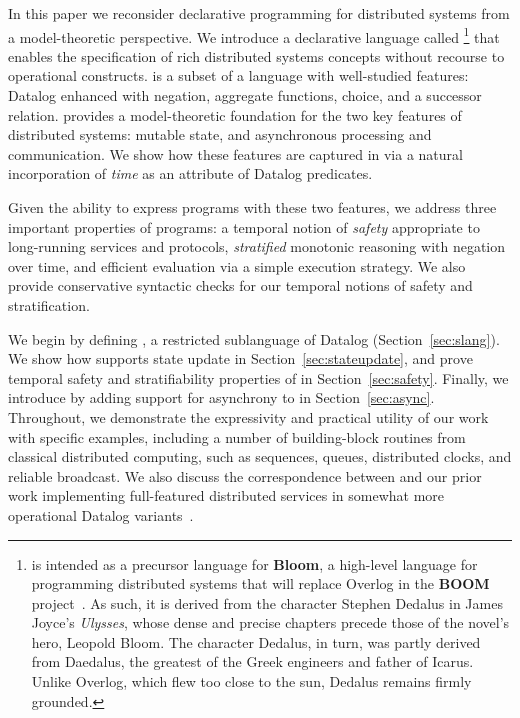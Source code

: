 In this paper we reconsider declarative programming for distributed
systems from a model-theoretic perspective. We introduce a declarative
language called \lang\footnote{\small \lang is intended as a precursor
  language for \textbf{Bloom}, a high-level language for programming
  distributed systems that will replace Overlog in the \textbf{BOOM}
  project~\cite{boom-eurosys}.  As such, it is derived from the
  character Stephen Dedalus in James Joyce's \emph{Ulysses}, whose
  dense and precise chapters precede those of the novel's hero,
  Leopold Bloom.  The character Dedalus, in turn, was partly derived
  from Daedalus, the greatest of the Greek engineers and father of
  Icarus.  Unlike Overlog, which flew too close to the sun, Dedalus
  remains firmly grounded.  } that enables the specification of rich
distributed systems concepts without recourse to operational
constructs.  \lang is a subset of a language with well-studied
features: Datalog enhanced with negation, aggregate functions, choice,
and a successor relation.  \lang provides a model-theoretic foundation
for the two key features of distributed systems: mutable state, and
asynchronous processing and communication.  We show how these features
are captured in \lang via a natural incorporation of {\em time} as an
attribute of Datalog predicates.

Given the ability to express programs with these two features, we
address three important properties of \lang programs: a temporal
notion of {\em safety} appropriate to long-running services and
protocols, {\em stratified} monotonic reasoning with negation over
time, and efficient evaluation via a simple execution strategy.  We
also provide conservative syntactic checks for our temporal notions of
safety and stratification.

We begin by defining \slang, a restricted sublanguage of Datalog
(Section~\ref{sec:slang}). We show how \slang supports state update in
Section~\ref{sec:stateupdate}, and prove temporal safety and
stratifiability properties of \slang in Section~\ref{sec:safety}.
Finally, we introduce \lang by adding
support for asynchrony to \slang in
Section~\ref{sec:async}. Throughout, we demonstrate the expressivity
and practical utility of our work with specific examples, including a
number of building-block routines from classical distributed
computing, such as sequences, queues, distributed clocks, and reliable
broadcast.  We also discuss the correspondence between \lang and our
prior work implementing full-featured distributed services in somewhat
more operational Datalog variants~\cite{boom-eurosys,Loo2009-CACM}.

